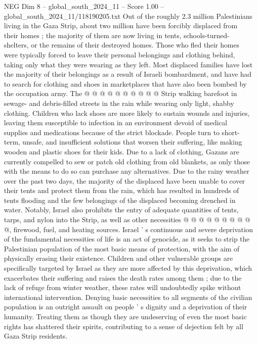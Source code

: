 \begin{textsample}{NEG Dim 8 – global\_south\_2024\_11 – Score 1.00 – global\_south\_2024\_11/118190205.txt}
Out of the roughly 2.3 million Palestinians living in the Gaza Strip, about two million have been forcibly displaced from their homes ; the majority of them are now living in tents, schools-turned-shelters, or the remains of their destroyed homes.
Those who fled their homes were typically forced to leave their personal belongings and clothing behind, taking only what they were wearing as they left.
Most displaced families have lost the majority of their belongings as a result of Israeli bombardment, and have had to search for clothing and shoes in marketplaces that have also been bombed by the occupation army.
The @ @ @ @ @ @ @ @ @ @ Strip walking barefoot in sewage- and debris-filled streets in the rain while wearing only light, shabby clothing.
Children who lack shoes are more likely to sustain wounds and injuries, leaving them susceptible to infection in an environment devoid of medical supplies and medications because of the strict blockade.
People turn to short-term, unsafe, and insufficient solutions that worsen their suffering, like making wooden and plastic shoes for their kids.
Due to a lack of clothing, Gazans are currently compelled to sew or patch old clothing from old blankets, as only those with the means to do so can purchase any alternatives.
Due to the rainy weather over the past two days, the majority of the displaced have been unable to cover their tents and protect them from the rain, which has resulted in hundreds of tents flooding and the few belongings of the displaced becoming drenched in water.
Notably, Israel also prohibits the entry of adequate quantities of tents, tarps, and nylon into the Strip, as well as other necessities @ @ @ @ @ @ @ @ @ @, firewood, fuel, and heating sources.
Israel ' s continuous and severe deprivation of the fundamental necessities of life is an act of genocide, as it seeks to strip the Palestinian population of the most basic means of protection, with the aim of physically erasing their existence.
Children and other vulnerable groups are specifically targeted by Israel as they are more affected by this deprivation, which exacerbates their suffering and raises the death rates among them ; due to the lack of refuge from winter weather, these rates will undoubtedly spike without international intervention.
Denying basic necessities to all segments of the civilian population is an outright assault on people ' s dignity and a deprivation of their humanity.
Treating them as though they are undeserving of even the most basic rights has shattered their spirits, contributing to a sense of dejection felt by all Gaza Strip residents.

\end{textsample}
